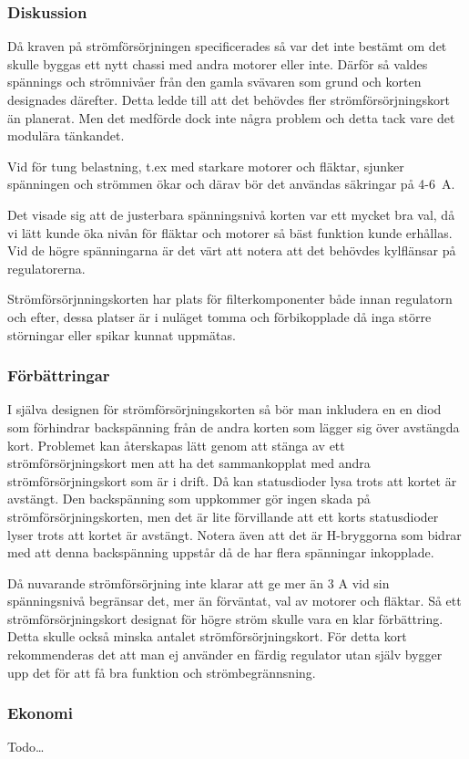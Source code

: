 \subsubsection{Diskussion}
Då kraven på strömförsörjningen specificerades så var det inte bestämt om det
skulle byggas ett nytt chassi med andra motorer eller inte. Därför så valdes
spännings och strömnivåer från den gamla svävaren som grund och korten
designades därefter. Detta ledde till att det behövdes fler
strömförsörjningskort än planerat. Men det medförde dock inte några problem och
detta tack vare det modulära tänkandet.

Vid för tung belastning, t.ex med starkare motorer och fläktar,
sjunker spänningen och strömmen ökar och därav bör det användas säkringar
på 4-6~A.

Det visade sig att de justerbara spänningsnivå korten var ett mycket bra val, då
vi lätt kunde öka nivån för fläktar och motorer så bäst funktion kunde erhållas.
Vid de högre spänningarna är det värt att notera att det behövdes kylflänsar
på regulatorerna.

Strömförsörjnningskorten har plats för filterkomponenter både innan regulatorn
och efter, dessa platser är i nuläget tomma och förbikopplade då inga större
störningar eller spikar kunnat uppmätas.

\subsubsection{Förbättringar}
I själva designen för strömförsörjningskorten så bör man inkludera en en
diod som förhindrar backspänning från de andra korten som lägger sig
över avstängda kort. Problemet kan återskapas lätt genom att stänga av ett
strömförsörjningskort men att ha det sammankopplat med andra
strömförsörjningskort som är i drift. Då kan statusdioder lysa trots att kortet
är avstängt. Den backspänning som uppkommer gör ingen skada på
strömförsörjningskorten, men det är lite förvillande att ett korts statusdioder
lyser trots att kortet är avstängt. Notera även  att det är H-bryggorna som
bidrar med att denna backspänning uppstår då de har flera spänningar inkopplade.

Då nuvarande strömförsörjning inte klarar att ge mer än 3 A vid sin
spänningsnivå begränsar det, mer än förväntat, val av motorer och fläktar. Så
ett strömförsörjningskort designat för högre ström skulle vara en klar
förbättring. Detta skulle också minska antalet strömförsörjningskort.
För detta kort rekommenderas det att man ej använder en färdig regulator utan
själv bygger upp det för att få bra funktion och strömbegrännsning.

\subsubsection{Ekonomi}
Todo\ldots
